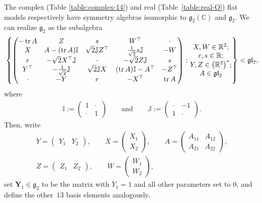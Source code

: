 \documentclass[pdftex]{sigma}
\DeclareMathOperator{\tr} {tr}
\newcommand{\bbC}{\mathbb{C}}
\newcommand{\bbI}{\mathbb{I}}
\newcommand{\bbJ}{\mathbb{J}}
\newcommand{\bbR}{\mathbb{R}}
\newcommand{\mbY}{\mathbf{Y}}
\newcommand{\mfg} {\mathfrak{g}}
\newcommand{\mfgl} {\mathfrak{gl}}
\numberwithin{equation}{section}
\begin{document}
The complex (Table \ref{table:complex-14}) and real (Table~\ref{table:real-O}) flat models respectively have symmetry algebras isomorphic to $\mfg_2(\bbC)$ and $\mfg_2$. We can realize $\mfg_2$ as the subalgebra \cite{SagerschnigWillseOperator}
\begin{gather}\label{equation:g2}
	\left\{
		\begin{pmatrix}
			- \tr A & Z & s & W^{\top} & \cdot \\
			X & A - (\tr A) \bbI & \sqrt{2} \bbJ Z^{\top} & \frac{1}{\sqrt{2}} s \bbJ & -W \\
			r & -\sqrt{2} X^{\top} \bbJ & \cdot & -\sqrt{2} Z \bbJ & s \\
			Y^{\top} & -\frac{1}{\sqrt{2}} \bbJ & \sqrt{2} \bbJ X & (\tr A) \bbI - A^{\top} & -Z^{\top} \\
			\cdot & -Y & r & -X^{\top} & \tr A
		\end{pmatrix}
			\colon
		\begin{array}{@{}c@{}}
			X, W \in \bbR^2 ; \\
			r, s \in \bbR ; \\
			Y, Z \in \big(\bbR^2\big)^*; \\
			A \in \mfgl_2
		\end{array}
	\right\} < \mfgl_7 ,
\end{gather}
where
\begin{gather*}
	\bbI := \begin{pmatrix}1&\cdot\\ \cdot&1\end{pmatrix}
		\qquad \textrm{and} \qquad
	\bbJ := \begin{pmatrix}\cdot&-1\\1&\cdot\end{pmatrix} .
\end{gather*}
Then, write
\begin{gather*}
	Y = \begin{pmatrix}Y_1 & Y_2\end{pmatrix}, \qquad
	X = \begin{pmatrix}X_1 \\ X_2\end{pmatrix}, \qquad
	A = \begin{pmatrix}A_{11} & A_{12} \\ A_{21} & A_{22}\end{pmatrix}, \\
	Z = \begin{pmatrix}Z_1 & Z_2\end{pmatrix}, \qquad
	W = \begin{pmatrix}W_1 \\ W_2\end{pmatrix},
\end{gather*}
set $\mbY_1 \in \mfg_2$ to be the matrix with $Y_1 = 1$ and all other parameters set to $0$, and define the other~$13$ basis elements analogously.
\end{document}
